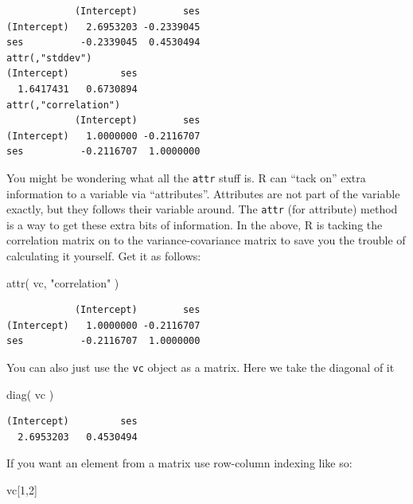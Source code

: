 \documentclass[
  letterpaper,
  DIV=11,
  numbers=noendperiod]{scrreprt}
\newenvironment{Shaded}{\begin{snugshade}}{\end{snugshade}}
\newcommand{\DecValTok}[1]{\textcolor[rgb]{0.25,0.63,0.44}{#1}}
\newcommand{\FunctionTok}[1]{\textcolor[rgb]{0.02,0.16,0.49}{#1}}
\newcommand{\NormalTok}[1]{\textcolor[rgb]{0.00,0.44,0.13}{#1}}
\newcommand{\StringTok}[1]{\textcolor[rgb]{0.25,0.44,0.63}{#1}}
\begin{document}
\begin{verbatim}
            (Intercept)        ses
(Intercept)   2.6953203 -0.2339045
ses          -0.2339045  0.4530494
attr(,"stddev")
(Intercept)         ses 
  1.6417431   0.6730894 
attr(,"correlation")
            (Intercept)        ses
(Intercept)   1.0000000 -0.2116707
ses          -0.2116707  1.0000000
\end{verbatim}

You might be wondering what all the \texttt{attr} stuff is. R can ``tack
on'' extra information to a variable via ``attributes''. Attributes are
not part of the variable exactly, but they follows their variable
around. The \texttt{attr} (for attribute) method is a way to get these
extra bits of information. In the above, R is tacking the correlation
matrix on to the variance-covariance matrix to save you the trouble of
calculating it yourself. Get it as follows:

\begin{Shaded}
\begin{Highlighting}[]
\FunctionTok{attr}\NormalTok{( vc, }\StringTok{"correlation"}\NormalTok{ )}
\end{Highlighting}
\end{Shaded}

\begin{verbatim}
            (Intercept)        ses
(Intercept)   1.0000000 -0.2116707
ses          -0.2116707  1.0000000
\end{verbatim}

You can also just use the \texttt{vc} object as a matrix. Here we take
the diagonal of it

\begin{Shaded}
\begin{Highlighting}[]
\FunctionTok{diag}\NormalTok{( vc )}
\end{Highlighting}
\end{Shaded}

\begin{verbatim}
(Intercept)         ses 
  2.6953203   0.4530494 
\end{verbatim}

If you want an element from a matrix use row-column indexing like so:

\begin{Shaded}
\begin{Highlighting}[]
\NormalTok{vc[}\DecValTok{1}\NormalTok{,}\DecValTok{2}\NormalTok{]}
\end{Highlighting}
\end{Shaded}
\end{document}
